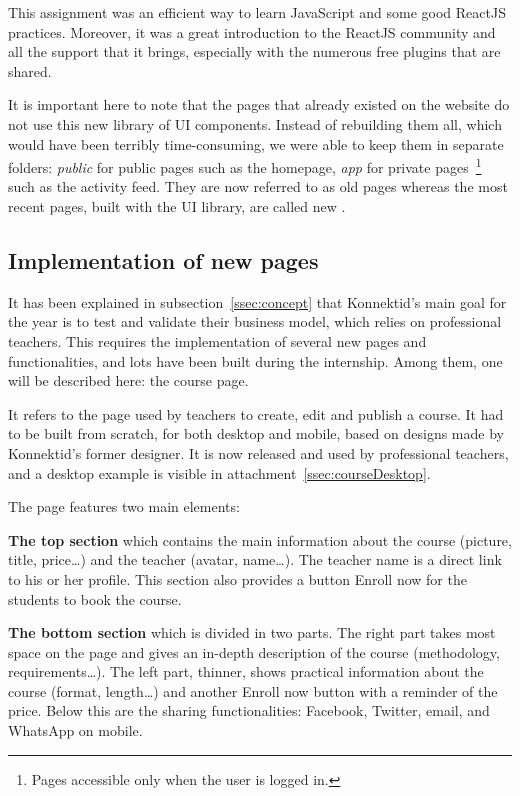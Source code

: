 This assignment was an efficient way to learn JavaScript and some good ReactJS practices. Moreover, it was a great introduction to the ReactJS community and all the support that it brings, especially with the numerous free plugins that are shared.

It is important here to note that the pages that already existed on the website do not use this new library of UI components. Instead of rebuilding them all, which would have been terribly time-consuming, we were able to keep them in separate folders: \textit{public} for public pages such as the homepage, \textit{app} for private pages~\footnote{Pages accessible only when the user is logged in.} such as the activity feed. They are now referred to as \guillemotleft{} old \guillemotright{} pages whereas the most recent pages, built with the UI library, are called \guillemotleft{} new \guillemotright{}.

\subsection{Implementation of new pages}
\label{ssec:new_pages}

It has been explained in {\sc subsection}~\ref{ssec:concept} that Konnektid's main goal for the year is to test and validate their business model, which relies on
professional teachers. This requires the implementation of several new pages and functionalities, and lots have been built during the internship. Among them, one will be described here: the course page.

It refers to the page used by teachers to create, edit and publish a course. It had to be built from scratch, for both desktop and mobile, based on designs
made by Konnektid's former designer. It is now released and used by professional teachers, and a desktop example is visible in {\sc attachment}~\ref{ssec:courseDesktop}.

The page features two main elements:

\textbf{The top section} which contains the main information about the course (picture, title, price\ldots) and the teacher (avatar, name\ldots).
The teacher name is a direct link to his or her profile. This section also provides a button \guillemotleft{} Enroll now \guillemotright{} for the students to book the course.

\textbf{The bottom section} which is divided in two parts. The right part takes most space on the page and gives an in-depth description of the course
(methodology, requirements\ldots). The left part, thinner, shows practical information about the course (format, length\ldots) and another \guillemotleft{} Enroll now \guillemotright{} button with a reminder of the price. Below this are the sharing functionalities: Facebook, Twitter,
email, and WhatsApp on mobile.

